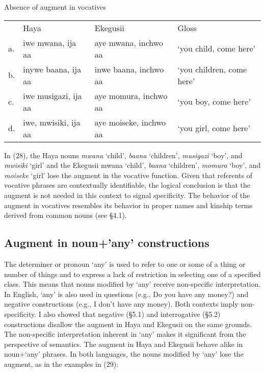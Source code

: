 \documentclass[output=paper]{langscibook}
\begin{document}
\begin{exe}
\ex Absence of augment in vocatives \\
\label{hayagusii28}
\begin{tabular}{llll}
        &     Haya	&		Ekegusii	&		Gloss	\\	 
a. &	iwe mwana, ija aa &	aye mwana, inchwo aa &	‘you child, come here’   \\		
b. &	inywe baana, ija aa  &	inwe baana, inchwo aa &	‘you children, come here’ \\
c. &	iwe musigazi, ija aa &	aye momura, inchwo aa &	‘you boy, come here’ \\	
d. &	iwe, mwisiki, ija aa &	aye moiseke, inchwo aa &	‘you girl, come here’ \\

\end{tabular}
\end{exe}
In (28), the Haya nouns \textit{mwana} ‘child’, \textit{baana} ‘children’, \textit{musigazi} ‘boy’, and \textit{mwisiki} ‘girl’ and the Ekegusii mwana ‘child’, \textit{baana} ‘children’, \textit{momura} ‘boy’, and \textit{moiseke} ‘girl’ lose the augment in the vocative function. Given that referents of vocative phrases are contextually identifiable, the logical conclusion is that the augment is not needed in this context to signal specificity. The behavior of the augment in vocatives resembles its behavior in proper names and kinship terms derived from common nouns (see §4.1).  

\subsection{Augment in noun+’any’ constructions}
	The determiner or pronoun ‘any’ is used to refer to one or some of a thing or number of things and to express a lack of restriction in selecting one of a specified class. This means that nouns modified by ‘any’ receive non-specific interpretation. In English, ‘any’ is also used in questions (e.g., Do you have any money?) and negative constructions (e.g., I don’t have any money). Both contexts imply non-specificity. I also showed that negative (§5.1) and interrogative (§5.2) constructions disallow the augment in Haya and Ekegusii on the same grounds. The non-specific interpretation inherent in ‘any’ makes it significant from the perspective of semantics. The augment in Haya and Ekegusii behave alike in noun+‘any’ phrases. In both languages, the nouns modified by ‘any’ lose the augment, as in the examples in (29):
\end{document}

